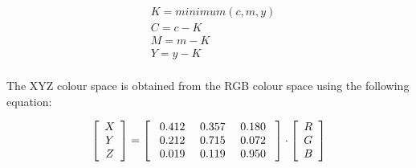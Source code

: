 \documentclass[final,a4paper,12pt,english]{UnicaPhdThesis3}
\begin{document}
\begin{equation}\label{cmyk}
\begin{split}
&K = minimum (c, m, y)\\
&C = c - K\\
&M = m - K\\
&Y = y - K\\
\end{split}
\end{equation}

The XYZ colour space is obtained from the RGB colour space using the following equation:

\begin{equation}
\left [ { \begin{array}{c} X  \\ Y   \\ Z \end{array} } \right ] = 
\left [ { \begin{array}{c c c} \mbox{ 0.412}  & \mbox{ 0.357} &  \mbox{ 0.180 } \\ \mbox{ 0.212} & \mbox{ 0.715} & \mbox{ 0.072 } \\ \mbox{ 0.019} & \mbox{ 0.119} & \mbox{ 0.950 }  \end{array} } \right ] \cdot \left [ { \begin{array}{c} R  \\ G  \\ B     \end{array} } \right ] 
\end{equation}
\end{document}
